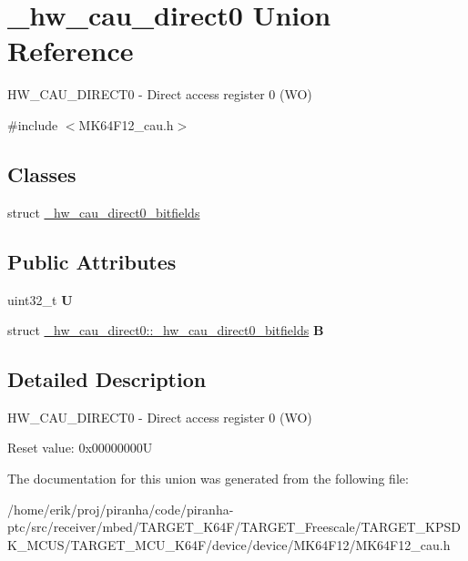 \hypertarget{union__hw__cau__direct0}{}\section{\+\_\+hw\+\_\+cau\+\_\+direct0 Union Reference}
\label{union__hw__cau__direct0}


H\+W\+\_\+\+C\+A\+U\+\_\+\+D\+I\+R\+E\+C\+T0 -\/ Direct access register 0 (WO)  




{\ttfamily \#include $<$M\+K64\+F12\+\_\+cau.\+h$>$}

\subsection*{Classes}
\begin{DoxyCompactItemize}
\item 
struct \hyperlink{struct__hw__cau__direct0_1_1__hw__cau__direct0__bitfields}{\+\_\+hw\+\_\+cau\+\_\+direct0\+\_\+bitfields}
\end{DoxyCompactItemize}
\subsection*{Public Attributes}
\begin{DoxyCompactItemize}
\item 
uint32\+\_\+t {\bfseries U}\hypertarget{union__hw__cau__direct0_aa1cd4536adc3b300c30d36e1db70820e}{}\label{union__hw__cau__direct0_aa1cd4536adc3b300c30d36e1db70820e}

\item 
struct \hyperlink{struct__hw__cau__direct0_1_1__hw__cau__direct0__bitfields}{\+\_\+hw\+\_\+cau\+\_\+direct0\+::\+\_\+hw\+\_\+cau\+\_\+direct0\+\_\+bitfields} {\bfseries B}\hypertarget{union__hw__cau__direct0_a0fc68479da4853f73227733146970110}{}\label{union__hw__cau__direct0_a0fc68479da4853f73227733146970110}

\end{DoxyCompactItemize}


\subsection{Detailed Description}
H\+W\+\_\+\+C\+A\+U\+\_\+\+D\+I\+R\+E\+C\+T0 -\/ Direct access register 0 (WO) 

Reset value\+: 0x00000000U 

The documentation for this union was generated from the following file\+:\begin{DoxyCompactItemize}
\item 
/home/erik/proj/piranha/code/piranha-\/ptc/src/receiver/mbed/\+T\+A\+R\+G\+E\+T\+\_\+\+K64\+F/\+T\+A\+R\+G\+E\+T\+\_\+\+Freescale/\+T\+A\+R\+G\+E\+T\+\_\+\+K\+P\+S\+D\+K\+\_\+\+M\+C\+U\+S/\+T\+A\+R\+G\+E\+T\+\_\+\+M\+C\+U\+\_\+\+K64\+F/device/device/\+M\+K64\+F12/M\+K64\+F12\+\_\+cau.\+h\end{DoxyCompactItemize}

